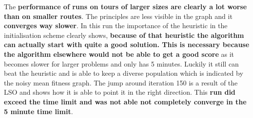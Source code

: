 \documentclass[a4paper,10pt]{article}
\begin{document}
The \textbf{performance of runs on tours of larger sizes are clearly a lot worse than on smaller routes}. The principles are less visible in the graph and it \textbf{converges way slower}. In this run the importance of the heuristic in the initialisation scheme clearly shows, \textbf{because of that heuristic the algorithm can actually start with quite a good solution. This is necessary because the algorithm elsewhere would not be able to get a good score} as it becomes slower for larger problems and only has 5 minutes. Luckily it still can beat the heuristic and is able to keep a diverse population which is indicated by the noisy mean fitness graph. The jump around iteration 150 is a result of the LSO and shows how it is able to point it in the right direction. This \textbf{run did exceed the time limit and was not able not completely converge in the 5 minute time limit}.
\end{document}

